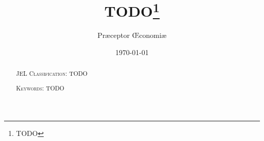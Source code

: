 \documentclass[english,a4paper,11pt]{article}
\title{TODO\thanks{TODO}}
\author[1,2]{Præceptor Œconomiæ}
\affil[1]{First University}
\affil[2]{Second University}
\date{\today} %
\theoremstyle{definition}
\begin{document}
\frenchspacing
\maketitle

\begin{abstract}
    
    \par\vspace{1em}

    \noindent\textsc{JEL Classification}: TODO\par\vspace{1em}

    \noindent\textsc{Keywords}: TODO
\end{abstract}









\appendix


\end{document}
